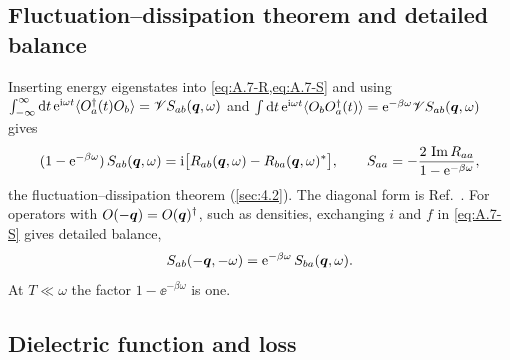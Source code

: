 \subsection{Fluctuation--dissipation theorem and detailed balance}

Inserting energy eigenstates into \cref{eq:A.7-R,eq:A.7-S} and using $\int_{-\infty}^{\infty}\mathrm{d} t\,\mathrm{e}^{\mathrm{i}\omega t}\langle O_a^\dagger(t)O_b\rangle = \mathscr{V} S_{ab}(\bm{q},\omega)$ and $\int\mathrm{d} t\,\mathrm{e}^{\mathrm{i}\omega t}\langle O_bO_a^\dagger(t)\rangle = \mathrm{e}^{-\beta\omega}\mathscr{V} S_{ab}(\bm{q},\omega)$ gives
\begin{equation}
  (1 - \mathrm{e}^{-\beta\omega})\,S_{ab}(\bm{q},\omega) = \mathrm{i}\bigl[R_{ab}(\bm{q},\omega) - R_{ba}(\bm{q},\omega)^*\bigr], \qquad
  S_{aa} = -\frac{2\,\operatorname{Im} R_{aa}}{1 - \mathrm{e}^{-\beta\omega}},
  \label{eq:A.7-FDT}
\end{equation}
the fluctuation--dissipation theorem (\cref{sec:4.2}). The diagonal form is Ref.~\cite[Eq.~(3)]{knapen2021dark}. For operators with $O(-\bm{q}) = O(\bm{q})^\dagger$, such as densities, exchanging $i$ and $f$ in \cref{eq:A.7-S} gives detailed balance,
\begin{equation}
  S_{ab}(-\bm{q},-\omega) = \mathrm{e}^{-\beta\omega}\,S_{ba}(\bm{q},\omega).
  \label{eq:A.7-DB}
\end{equation}
At $T \ll \omega$ the factor $1 - \ee^{-\beta\omega}$ is one.

\subsection{Dielectric function and loss}

